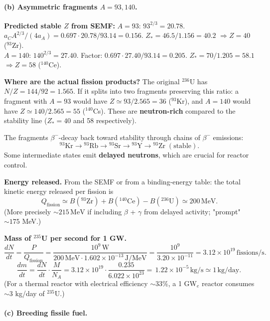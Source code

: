 \documentclass[11pt]{article}
\newcommand{\MeV}{\,\mathrm{MeV}}
\begin{document}
\paragraph{(b) Asymmetric fragments $A=93,140$.}

\textbf{Predicted stable $Z$ from SEMF:}
$A=93$: $93^{2/3}=20.78$. $a_C A^{2/3}/(4a_A)=0.697\cdot 20.78/93.14=0.156$. $Z_*=46.5/1.156=40.2$ $\Rightarrow Z=40$ ($^{93}$Zr).\\
$A=140$: $140^{2/3}=27.40$. Factor: $0.697\cdot 27.40/93.14=0.205$. $Z_*=70/1.205=58.1$ $\Rightarrow Z=58$ ($^{140}$Ce).

\textbf{Where are the actual fission products?} The original $^{236}$U has $N/Z=144/92=1.565$. If it splits into two fragments preserving this ratio: a fragment with $A=93$ would have $Z\simeq 93/2.565=36$ ($^{93}$Kr), and $A=140$ would have $Z\simeq 140/2.565=55$ ($^{140}$Cs). These are \textbf{neutron-rich} compared to the stability line ($Z_*=40$ and 58 respectively).

The fragments $\beta^-$-decay back toward stability through chains of $\beta^-$ emissions:
\[
^{93}\mathrm{Kr}\to{}^{93}\mathrm{Rb}\to{}^{93}\mathrm{Sr}\to{}^{93}\mathrm{Y}\to{}^{93}\mathrm{Zr}\;(\text{stable}).
\]
Some intermediate states emit \textbf{delayed neutrons}, which are crucial for reactor control.

\textbf{Energy released.} From the SEMF or from a binding-energy table: the total kinetic energy released per fission is
\[
Q_\mathrm{fission}\simeq B(^{93}\text{Zr})+B(^{140}\text{Ce})-B(^{236}\text{U})\simeq 200\MeV.
\]
(More precisely $\sim 215\MeV$ if including $\beta$ + $\gamma$ from delayed activity; "prompt" $\sim 175$ MeV.)

\textbf{Mass of $^{235}$U per second for 1 GW.}
\[
\frac{dN}{dt}=\frac{P}{Q_\mathrm{fission}}=\frac{10^{9}\,\mathrm{W}}{200\MeV\cdot 1.602\times 10^{-13}\,\mathrm{J/MeV}}=\frac{10^{9}}{3.20\times 10^{-11}}=3.12\times 10^{19}\,\mathrm{fissions/s}.
\]
\[
\frac{dm}{dt}=\frac{dN}{dt}\cdot\frac{M}{N_A}=3.12\times 10^{19}\cdot\frac{0.235}{6.022\times 10^{23}}=\boxed{\,1.22\times 10^{-5}\,\mathrm{kg/s}\simeq 1\,\mathrm{kg/day}.\,}
\]
(For a thermal reactor with electrical efficiency $\sim 33\%$, a 1 GW$_e$ reactor consumes $\sim 3$ kg/day of $^{235}$U.)

\paragraph{(c) Breeding fissile fuel.}
\end{document}
